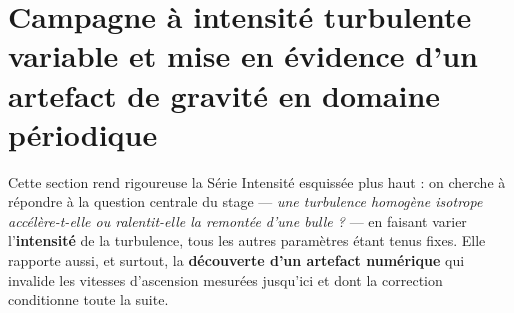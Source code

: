\newpage
\section{Campagne à intensité turbulente variable et mise en évidence d'un
artefact de gravité en domaine périodique}
\label{sec:designA}

%

Cette section rend rigoureuse la \og{}Série Intensité\fg{} esquissée plus haut :
on cherche à répondre à la question centrale du stage --- \emph{une turbulence
homogène isotrope accélère-t-elle ou ralentit-elle la remontée d'une bulle ?} ---
en faisant varier l'\textbf{intensité} de la turbulence, tous les autres
paramètres étant tenus fixes. Elle rapporte aussi, et surtout, la
\textbf{découverte d'un artefact numérique} qui invalide les vitesses
d'ascension mesurées jusqu'ici et dont la correction conditionne toute la suite.

